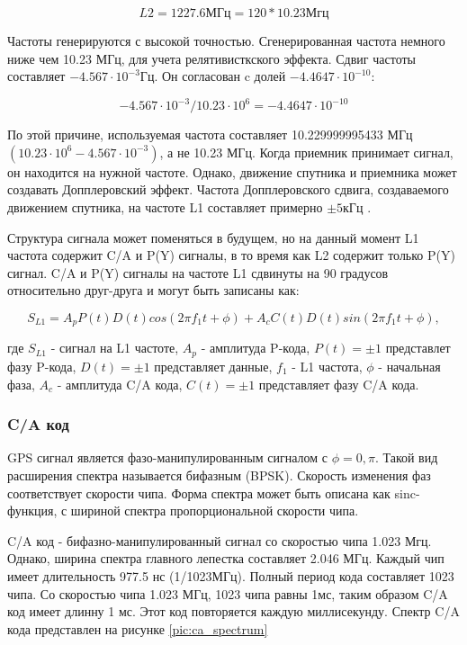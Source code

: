 \begin{equation}
L2=1227.6\mbox{МГц}=120*10.23\mbox{Мгц}
\label{eq:l2_freq}
\end{equation}

Частоты генерируются с высокой точностью. Сгенерированная частота немного ниже чем 10.23 МГц, для учета 
релятивисткского эффекта. Сдвиг частоты составляет ${-4.567\cdot10^{-3}\mbox{Гц}}$. Он согласован c долей
${-4.4647\cdot10^{-10}}$:

\begin{equation}
-4.567\cdot10^{-3}/10.23\cdot10^{6} = -4.4647\cdot10^{-10}
\end{equation}

По этой причине, используемая частота составляет 10.229999995433 МГц ${(10.23\cdot10^{6} - 4.567\cdot10^{-3})}$,
а не 10.23 МГц. Когда приемник принимает сигнал, он находится
на нужной частоте. Однако, движение спутника и приемника может создавать Допплеровский эффект. Частота Допплеровского
сдвига, создаваемого движением спутника, на частоте L1 составляет примерно ${\pm5\mbox{кГц}}$ \cite{yacenkov, tsui}.

Структура сигнала может поменяться в будущем, но на данный момент L1 частота содержит C/A и P(Y) сигналы, в то
время как L2 содержит только P(Y) сигнал. C/A и P(Y) сигналы на частоте L1 сдвинуты на 90 градусов
относительно друг-друга и могут быть записаны как:

\begin{equation}
S_{L1}=A_p P(t) D(t) cos(2\pi f_1 t + \phi) + A_c C(t) D(t) sin(2\pi f_1 t + \phi),
\label{eq:l2_freq}
\end{equation}

где ${S_{L1}}$ - сигнал на L1 частоте, ${A_p}$ - амплитуда P-кода, ${P(t)=\pm 1}$ представлет фазу P-кода,
${D(t) = \pm 1}$ представляет данные, ${f_1}$ - L1 частота, ${\phi}$ - начальная фаза, ${A_c}$ - амплитуда C/A кода,
${C(t)} = \pm 1$ представляет фазу C/A кода.

\subsubsection{C/A код}
GPS сигнал является фазо-манипулированным сигналом с ${\phi = 0, \pi}$. Такой вид расширения спектра называется бифазным 
(BPSK). Скорость изменения фаз соответствует скорости чипа. Форма спектра может быть описана как sinc-функция,
с шириной спектра пропорциональной скорости чипа. 

C/A код - бифазно-манипулированный сигнал со скоростью чипа 1.023 Мгц. Однако, ширина спектра главного лепестка составляет
2.046 МГц. Каждый чип имеет длительность 977.5 нс (1/1023МГц). Полный период кода составляет 1023 чипа. Со скоростью
чипа 1.023 МГц, 1023 чипа равны 1мс, таким образом C/A код имеет длинну 1 мс. Этот код повторяется каждую миллисекунду.
Спектр C/A кода представлен на рисунке \ref{pic:ca_spectrum}

